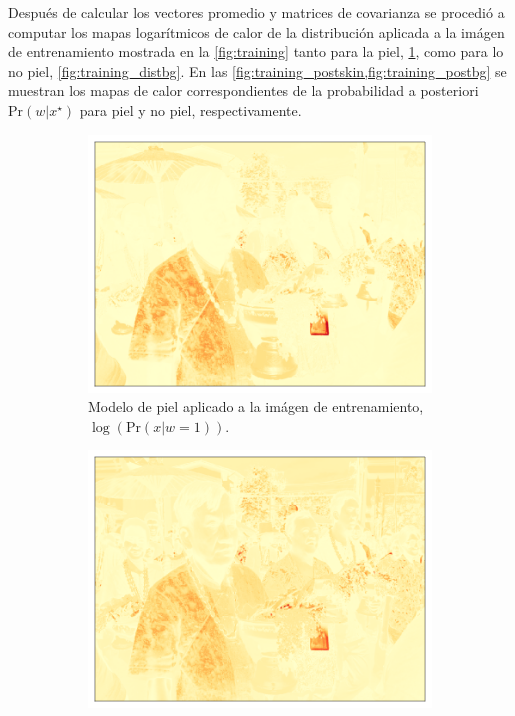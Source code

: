 Después de calcular los vectores promedio y matrices de covarianza se procedió a computar los mapas logarítmicos de calor de la distribución aplicada a la imágen de entrenamiento mostrada en la \cref{fig:training} tanto para la piel, \cref{fig:training_distskin}, como para lo no piel, \cref{fig:training_distbg}. En las \cref{fig:training_postskin,fig:training_postbg} se muestran los mapas de calor correspondientes de la probabilidad a posteriori $\text{Pr}(w | x^{\star})$ para piel y no piel, respectivamente.
\begin{figure}[h!]
    \centering
    \begin{subfigure}{0.4\textwidth}
        \centering
        \includegraphics[width=\textwidth]{../figures/image1/image_01_distskin.png}
        \caption{Modelo de piel aplicado a la imágen de entrenamiento, $\log(\text{Pr}(x | w=1))$.}
        \label{fig:training_distskin}
    \end{subfigure}
    \hspace{1cm}
    \begin{subfigure}{0.4\textwidth}
        \centering
        \includegraphics[width=\textwidth]{../figures/image1/image_01_distbg.png}

\end{subfigure}
\end{figure}
